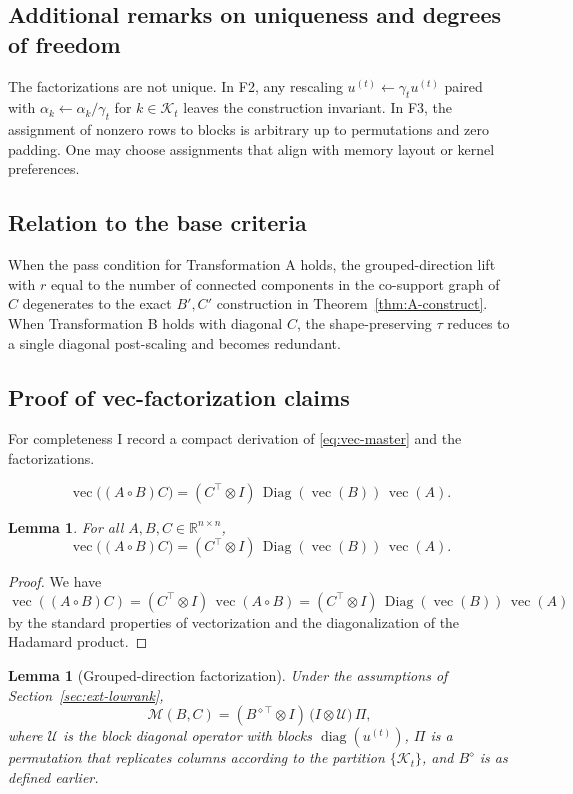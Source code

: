 \documentclass[11pt,a4paper]{article}
\newtheorem{lemma}[theorem]{Lemma}
\theoremstyle{definition}
\newcommand{\R}{\mathbb{R}}
\newcommand{\Had}{\circ}
\newcommand{\diag}{\operatorname{diag}}
\newcommand{\Diag}{\operatorname{Diag}}
\newcommand{\vecop}{\operatorname{vec}}
\begin{document}
\subsection{Additional remarks on uniqueness and degrees of freedom}
The factorizations are not unique. In F2, any rescaling $u^{(t)}\leftarrow \gamma_t u^{(t)}$ paired with $\alpha_k\leftarrow \alpha_k/\gamma_t$ for $k\in\mathcal{K}_t$ leaves the construction invariant. In F3, the assignment of nonzero rows to blocks is arbitrary up to permutations and zero padding. One may choose assignments that align with memory layout or kernel preferences.

\subsection{Relation to the base criteria}
When the pass condition for Transformation A holds, the grouped-direction lift with $r$ equal to the number of connected components in the co-support graph of $C$ degenerates to the exact $B',C'$ construction in Theorem~\ref{thm:A-construct}. When Transformation B holds with diagonal $C$, the shape-preserving $\tau$ reduces to a single diagonal post-scaling and becomes redundant.

\subsection{Proof of vec-factorization claims}
For completeness I record a compact derivation of \eqref{eq:vec-master} and the factorizations.

\begin{equation}\label{eq:vec-master}
\vecop\big( (A \Had B) C \big) = (C^\top \otimes I)\, \Diag(\vecop(B))\, \vecop(A).
\end{equation}

\begin{lemma}\label{lem:vec-master}
For all $A,B,C\in\R^{n\times n}$,
\[
\vecop\big( (A \Had B) C \big) = (C^\top \otimes I)\, \Diag(\vecop(B))\, \vecop(A).
\]
\end{lemma}

\begin{proof}
We have $\vecop( (A \Had B) C ) = (C^\top \otimes I)\, \vecop(A \Had B) = (C^\top \otimes I)\, \Diag(\vecop(B))\, \vecop(A)$ by the standard properties of vectorization and the diagonalization of the Hadamard product.
\end{proof}

\begin{lemma}[Grouped-direction factorization]\label{lem:grouped-factor}
Under the assumptions of Section~\ref{sec:ext-lowrank},
\[
\mathcal{M}(B,C) = (B^{\diamond\top} \otimes I)\, \big( I \otimes \mathcal{U} \big)\, \Pi,
\]
where $\mathcal{U}$ is the block diagonal operator with blocks $\diag(u^{(t)})$, $\Pi$ is a permutation that replicates columns according to the partition $\{\mathcal{K}_t\}$, and $B^\diamond$ is as defined earlier.
\end{lemma}
\end{document}
